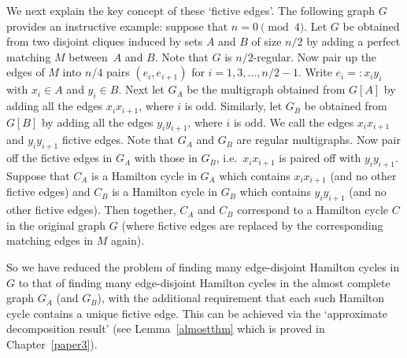 \documentclass{memo-l}
\numberwithin{section}{chapter}
\numberwithin{equation}{section}
\numberwithin{firstthm}{section}
\numberwithin{figure}{section}
\begin{document}
We next explain the key concept of these `fictive edges'.
The following graph $G$ provides an instructive example: suppose that $n=0  \pmod 4$. 
Let $G$ be obtained from two disjoint cliques induced by sets $A$ and $B$ of size $n/2$
by adding a perfect matching $M$ between~$A$ and $B$. Note that $G$ is $n/2$-regular. 
Now pair up the edges of $M$ into $n/4$ pairs $(e_i,e_{i+1})$ for $i = 1, 3, \dots, n/2-1$.
Write $e_i=:x_iy_i$ with $x_i \in A$ and $y_i \in B$.
Next let $G_A$ be the multigraph obtained from $G[A]$ by adding all the edges $x_ix_{i+1}$, where $i$ is odd.
Similarly, let $G_B$ be obtained from $G[B]$ by adding all the edges $y_iy_{i+1}$, where $i$ is odd.
We call the edges $x_ix_{i+1}$ and $y_iy_{i+1}$ fictive edges.
Note that $G_A$ and $G_B$ are regular multigraphs.
Now pair off the  fictive edges in $G_A$ with those in $G_B$, i.e.~$x_ix_{i+1}$ is paired off with 
$y_iy_{i+1}$. Suppose that $C_A$ is a Hamilton cycle in $G_A$ which contains $x_ix_{i+1}$ (and no
other fictive edges)
and $C_B$ is a Hamilton cycle in $G_B$ which contains $y_iy_{i+1}$ (and no
other fictive edges).
Then together, $C_A$ and $C_B$ correspond to a Hamilton cycle $C$ in the original graph $G$
(where fictive edges are replaced by the corresponding matching edges in $M$ again).




So we have reduced the problem of finding many edge-disjoint Hamilton cycles in $G$ to that of finding
many edge-disjoint Hamilton cycles in the almost complete graph $G_A$ (and $G_B$), 
with the additional requirement that each such Hamilton cycle contains a unique fictive edge.
This can be achieved via the `approximate decomposition result'  (see Lemma~\ref{almostthm} which is proved in Chapter~\ref{paper3}).
\end{document}
